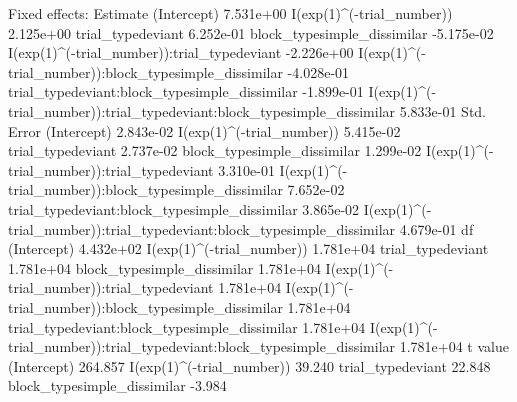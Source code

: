 \documentclass[10pt, letterpaper]{article}
\newenvironment{CodeChunk}{}{}
\begin{document}
\begin{CodeChunk}
\begin{CodeOutput}
Fixed effects:
                                                                          Estimate
(Intercept)                                                              7.531e+00
I(exp(1)^(-trial_number))                                                2.125e+00
trial_typedeviant                                                        6.252e-01
block_typesimple_dissimilar                                             -5.175e-02
I(exp(1)^(-trial_number)):trial_typedeviant                             -2.226e+00
I(exp(1)^(-trial_number)):block_typesimple_dissimilar                   -4.028e-01
trial_typedeviant:block_typesimple_dissimilar                           -1.899e-01
I(exp(1)^(-trial_number)):trial_typedeviant:block_typesimple_dissimilar  5.833e-01
                                                                        Std. Error
(Intercept)                                                              2.843e-02
I(exp(1)^(-trial_number))                                                5.415e-02
trial_typedeviant                                                        2.737e-02
block_typesimple_dissimilar                                              1.299e-02
I(exp(1)^(-trial_number)):trial_typedeviant                              3.310e-01
I(exp(1)^(-trial_number)):block_typesimple_dissimilar                    7.652e-02
trial_typedeviant:block_typesimple_dissimilar                            3.865e-02
I(exp(1)^(-trial_number)):trial_typedeviant:block_typesimple_dissimilar  4.679e-01
                                                                                df
(Intercept)                                                              4.432e+02
I(exp(1)^(-trial_number))                                                1.781e+04
trial_typedeviant                                                        1.781e+04
block_typesimple_dissimilar                                              1.781e+04
I(exp(1)^(-trial_number)):trial_typedeviant                              1.781e+04
I(exp(1)^(-trial_number)):block_typesimple_dissimilar                    1.781e+04
trial_typedeviant:block_typesimple_dissimilar                            1.781e+04
I(exp(1)^(-trial_number)):trial_typedeviant:block_typesimple_dissimilar  1.781e+04
                                                                        t value
(Intercept)                                                             264.857
I(exp(1)^(-trial_number))                                                39.240
trial_typedeviant                                                        22.848
block_typesimple_dissimilar                                              -3.984

\end{CodeOutput}
\end{CodeChunk}
\end{document}
